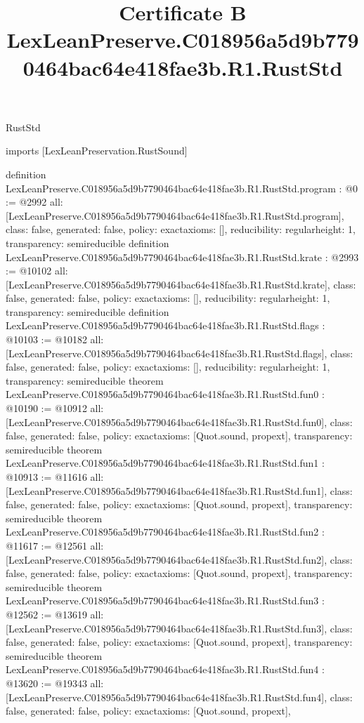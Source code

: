 \begin{lexlean}{RustStd}
\title{Certificate B LexLeanPreserve.C018956a5d9b7790464bac64e418fae3b.R1.RustStd}
\begin{coremodule}
imports [LexLeanPreservation.RustSound]

definition LexLeanPreserve.C018956a5d9b7790464bac64e418fae3b.R1.RustStd.program : @0 := @2992 {
  all: [LexLeanPreserve.C018956a5d9b7790464bac64e418fae3b.R1.RustStd.program],
  class: false,
  generated: false,
  policy: exact{axioms: []},
  reducibility: regular{height: 1},
  transparency: semireducible
}
definition LexLeanPreserve.C018956a5d9b7790464bac64e418fae3b.R1.RustStd.krate : @2993 := @10102 {
  all: [LexLeanPreserve.C018956a5d9b7790464bac64e418fae3b.R1.RustStd.krate],
  class: false,
  generated: false,
  policy: exact{axioms: []},
  reducibility: regular{height: 1},
  transparency: semireducible
}
definition LexLeanPreserve.C018956a5d9b7790464bac64e418fae3b.R1.RustStd.flags : @10103 := @10182 {
  all: [LexLeanPreserve.C018956a5d9b7790464bac64e418fae3b.R1.RustStd.flags],
  class: false,
  generated: false,
  policy: exact{axioms: []},
  reducibility: regular{height: 1},
  transparency: semireducible
}
theorem LexLeanPreserve.C018956a5d9b7790464bac64e418fae3b.R1.RustStd.fun0 : @10190 := @10912 {
  all: [LexLeanPreserve.C018956a5d9b7790464bac64e418fae3b.R1.RustStd.fun0],
  class: false,
  generated: false,
  policy: exact{axioms: [Quot.sound, propext]},
  transparency: semireducible
}
theorem LexLeanPreserve.C018956a5d9b7790464bac64e418fae3b.R1.RustStd.fun1 : @10913 := @11616 {
  all: [LexLeanPreserve.C018956a5d9b7790464bac64e418fae3b.R1.RustStd.fun1],
  class: false,
  generated: false,
  policy: exact{axioms: [Quot.sound, propext]},
  transparency: semireducible
}
theorem LexLeanPreserve.C018956a5d9b7790464bac64e418fae3b.R1.RustStd.fun2 : @11617 := @12561 {
  all: [LexLeanPreserve.C018956a5d9b7790464bac64e418fae3b.R1.RustStd.fun2],
  class: false,
  generated: false,
  policy: exact{axioms: [Quot.sound, propext]},
  transparency: semireducible
}
theorem LexLeanPreserve.C018956a5d9b7790464bac64e418fae3b.R1.RustStd.fun3 : @12562 := @13619 {
  all: [LexLeanPreserve.C018956a5d9b7790464bac64e418fae3b.R1.RustStd.fun3],
  class: false,
  generated: false,
  policy: exact{axioms: [Quot.sound, propext]},
  transparency: semireducible
}
theorem LexLeanPreserve.C018956a5d9b7790464bac64e418fae3b.R1.RustStd.fun4 : @13620 := @19343 {
  all: [LexLeanPreserve.C018956a5d9b7790464bac64e418fae3b.R1.RustStd.fun4],
  class: false,
  generated: false,
  policy: exact{axioms: [Quot.sound, propext]},
}
\end{coremodule}
\end{lexlean}

